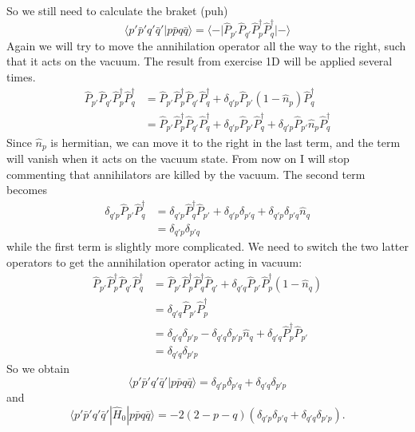 \documentclass[norsk,a4paper,12pt]{article}
\begin{document}
So we still need to calculate the braket (puh)
\begin{equation*}
\langle p'\bar{p}'q'\bar{q}'|p\bar{p}q\bar{q}\rangle=\langle-|\hat{P}_{p'}\hat{P}_{q'}\hat{P}_p^{\dagger}\hat{P}_q^{\dagger}|-\rangle
\end{equation*}
Again we will try to move the annihilation operator all the way to the right, such that it acts on the vacuum. The result from exercise 1D will be applied several times.
\begin{align*}
\hat{P}_{p'}\hat{P}_{q'}\hat{P}_p^{\dagger}\hat{P}_q^{\dagger}&=\hat{P}_{p'}\hat{P}_p^{\dagger}\hat{P}_{q'}\hat{P}_q^{\dagger}+\delta_{q'p}\hat{P}_{p'}(1-\hat{n}_p)\hat{P}_q^{\dagger}\\
&=\hat{P}_{p'}\hat{P}_p^{\dagger}\hat{P}_{q'}\hat{P}_q^{\dagger}+\delta_{q'p}\hat{P}_{p'}\hat{P}_q^{\dagger}+\delta_{q'p}\hat{P}_{p'}\hat{n}_p\hat{P}_q^{\dagger}
\end{align*}
Since $\hat{n}_p$ is hermitian, we can move it to the right in the last term, and the term will vanish when it acts on the vacuum state. From now on I will stop commenting that annihilators are killed by the vacuum. The second term becomes
\begin{align*}
\delta_{q'p}\hat{P}_{p'}\hat{P}_q^{\dagger}&=\delta_{q'p}\hat{P}_q^{\dagger}\hat{P}_{p'}+\delta_{q'p}\delta_{p'q}+\delta_{q'p}\delta_{p'q}\hat{n}_q\\
&=\delta_{q'p}\delta_{p'q}
\end{align*}
while the first term is slightly more complicated. We need to switch the two latter operators to get the annihilation operator acting in vacuum:
\begin{align*}
\hat{P}_{p'}\hat{P}_p^{\dagger}\hat{P}_{q'}\hat{P}_q^{\dagger}&=\hat{P}_{p'}\hat{P}_p^{\dagger}\hat{P}_{q}^{\dagger}\hat{P}_{q'}+\delta_{q'q}\hat{P}_{p'}\hat{P}_p^{\dagger}(1-\hat{n}_q)\\
&=\delta_{q'q}\hat{P}_{p'}\hat{P}_p^{\dagger}\\
&=\delta_{q'q}\delta_{p'p}-\delta_{q'q}\delta_{p'p}\hat{n}_q+\delta_{q'q}\hat{P}_p^{\dagger}\hat{P}_{p'}\\
&=\delta_{q'q}\delta_{p'p}
\end{align*}
So we obtain
\begin{equation}
\langle p'\bar{p}'q'\bar{q}'|p\bar{p}q\bar{q}\rangle=\delta_{q'p}\delta_{p'q}+\delta_{q'q}\delta_{p'p}
\end{equation}
and 
\begin{equation}
\langle p'\bar{p}'q'\bar{q}'|\hat{H}_0|p\bar{p}q\bar{q}\rangle=-2(2-p-q)(\delta_{q'p}\delta_{p'q}+\delta_{q'q}\delta_{p'p}).
\end{equation}
\end{document}
